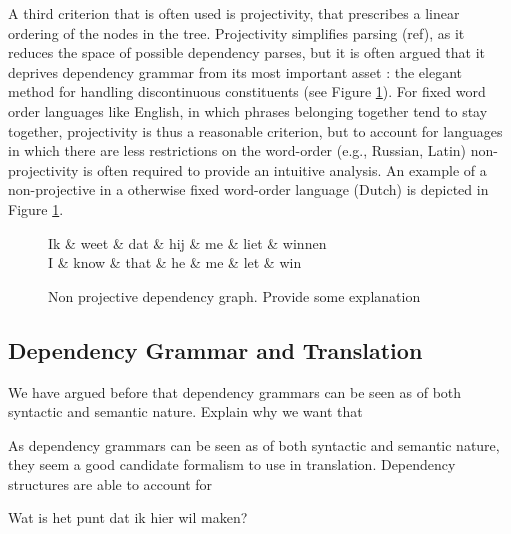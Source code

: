 \documentclass{report}
\theoremstyle{definition}
\theoremstyle{plain}
\begin{document}
A third criterion that is often used is projectivity, that prescribes a linear ordering of the nodes in the tree. Projectivity simplifies parsing (ref), as it reduces the space of possible dependency parses, but it is often argued that it deprives dependency grammar from its most important asset \citep{covington1990dependency,debusmann2000introduction}: the elegant method for handling discontinuous constituents (see Figure \ref{fig:npdeptree}). For fixed word order languages like English, in which phrases belonging together tend to stay together, projectivity is thus a reasonable criterion, but to account for languages in which there are less restrictions on the word-order (e.g., Russian, Latin) non-projectivity is often required to provide an intuitive analysis. An example of a non-projective in a otherwise fixed word-order language (Dutch) is depicted in Figure \ref{fig:npdeptree}.

\begin{figure}\label{fig:npdeptree}
\centering
\begin{dependency}[theme=simple]%
\begin{deptext}[column sep=.5cm, row sep=.1ex]
Ik \& weet \& dat \& hij \& me \& liet \& winnen\\
\tiny{I} \& \tiny{know} \& \tiny{that} \& \tiny{he} \& \tiny{me} \& \tiny{let} \& \tiny{win}\\
\end{deptext}
\end{dependency}
\caption{Non projective dependency graph. Provide some explanation}
\end{figure}

\subsection{Dependency Grammar and Translation}
\label{sec:deptrans}

We have argued before that dependency grammars can be seen as of both syntactic and semantic nature.
Explain why we want that

As dependency grammars can be seen as of both syntactic and semantic nature, they seem a good candidate formalism to use in translation. Dependency structures are able to account for 

Wat is het punt dat ik hier wil maken? 
\end{document}
